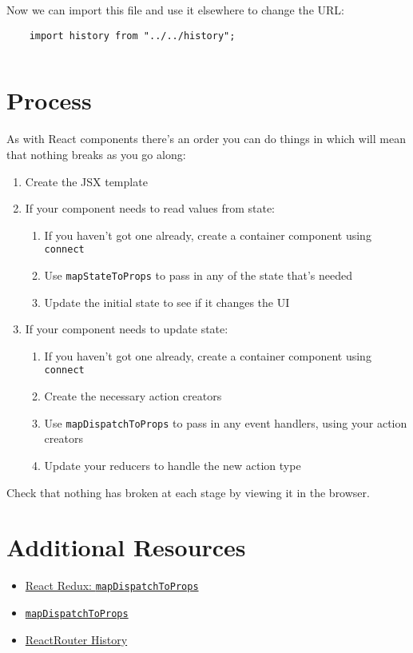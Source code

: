 Now we can import this file and use it elsewhere to change the URL:


\begin{verbatim}
    import history from "../../history";
\end{verbatim}

\inputminted{js}{03/figures/12-mapDispatch.js}



\section{Process}

As with React components there's an order you can do things in which will mean that nothing breaks as you go along:

\begin{enumerate}
    \item Create the JSX template
    \item If your component needs to read values from state:
        \begin{enumerate}
            \item If you haven't got one already, create a container component using \texttt{connect}
            \item Use \texttt{mapStateToProps} to pass in any of the state that's needed
            \item Update the initial state to see if it changes the UI
        \end{enumerate}
    \item If your component needs to update state:
        \begin{enumerate}
            \item If you haven't got one already, create a container component using \texttt{connect}
            \item Create the necessary action creators
            \item Use \texttt{mapDispatchToProps} to pass in any event handlers, using your action creators
            \item Update your reducers to handle the new action type
        \end{enumerate}
\end{enumerate}

Check that nothing has broken at each stage by viewing it in the browser.


\section{Additional Resources}

\begin{itemize}[leftmargin=*]
    \item \href{https://react-redux.js.org/using-react-redux/connect-mapdispatch}{React Redux: \texttt{mapDispatchToProps}}
    \item \href{https://learn.co/lessons/map-dispatch-to-props-readme}{\texttt{mapDispatchToProps}}
    \item \href{https://github.com/ReactTraining/history}{ReactRouter History}
\end{itemize}
